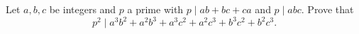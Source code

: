 Let $a,b,c$ be integers and $p$ a prime with $p\mid ab+bc+ca$ and $p\mid abc$. Prove that
\[p^2\mid a^3b^2+a^2b^3+a^3c^2+a^2c^3+b^3c^2+b^2c^3.\]
